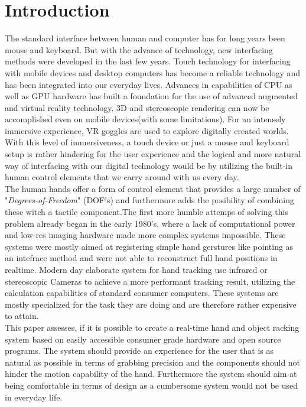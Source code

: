 \section{Introduction}
\label{sec:introduction}
The standard interface between human and computer has for long years been mouse and keyboard. But with the advance of technology, new interfacing methods were developed in the last few years.
Touch technology for interfacing with mobile devices and desktop computers has become a reliable technology and has been integrated into our everyday lives.
Advances in capabilities of CPU as well as GPU hardware has built a foundation for the use of advanced augmented and virtual reality technology. 3D and stereoscopic rendering can now be accomplished even on mobile devices(with some limitations). For an intensely immersive experience, VR goggles are used to explore digitally created worlds.\\
With this level of immersiveness, a touch device or just a mouse and keyboard setup is rather hindering for the user experience and the logical and more natural way of interfacing with our digital technology would be by utilizing the built-in human control elements that we carry around with us every day.\\ The human hands offer a form of control element that provides a large number of "\textit{Degrees-of-Freedom}" (DOF's) and furthermore adds the posibility of combining these witch a tactile component.The first more humble attemps of solving this problem already began in the early 1980's, where a lack of computational power and low-res imaging hardware made more complex systems impossible. These systems were mostly aimed at registering simple hand gerstures like pointing as an intefrace method and were not able to reconstruct full hand positions in realtime\cite{Bolt.1980}. Modern day elaborate system for hand tracking use infrared or stereoscopic Cameras to achieve a more performant tracking result, utilizing the calculation capabilities of standard consumer computers. These systems are mostly specialized for the task they are doing and are therefore rather expensive to attain. \\
This paper assesses, if it is possible to create a real-time hand and object racking system based on easily accessible consumer grade hardware and open source programs. The system should provide an experience for the user that is as natural as possible in terms of grabbing precision and the components should not hinder the motion capability of the hand. Furthermore the system should aim at being comfortable in terms of design as a cumbersome system would not be used  in everyday life.
